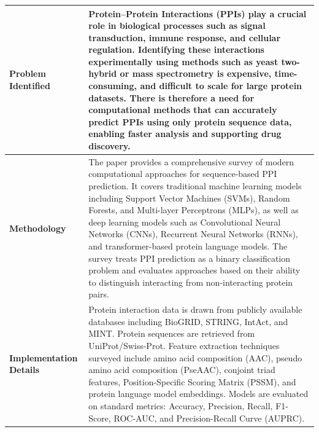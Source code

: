 \documentclass[12pt,a4paper]{report}
\begin{document}
\begin{table}[H]
\centering
\renewcommand{\arraystretch}{1.5}
\begin{tabular}{|p{}|p{}|}
\hline
\textbf{Problem Identified} & Protein–Protein Interactions (PPIs) play a crucial role in biological processes such as signal transduction, immune response, and cellular regulation. Identifying these interactions experimentally using methods such as yeast two-hybrid or mass spectrometry is expensive, time-consuming, and difficult to scale for large protein datasets. There is therefore a need for computational methods that can accurately predict PPIs using only protein sequence data, enabling faster analysis and supporting drug discovery. \\ \hline
\textbf{Methodology} & The paper provides a comprehensive survey of modern computational approaches for sequence-based PPI prediction. It covers traditional machine learning models including Support Vector Machines (SVMs), Random Forests, and Multi-layer Perceptrons (MLPs), as well as deep learning models such as Convolutional Neural Networks (CNNs), Recurrent Neural Networks (RNNs), and transformer-based protein language models. The survey treats PPI prediction as a binary classification problem and evaluates approaches based on their ability to distinguish interacting from non-interacting protein pairs. \\ \hline
\textbf{Implementation Details} & Protein interaction data is drawn from publicly available databases including BioGRID, STRING, IntAct, and MINT. Protein sequences are retrieved from UniProt/Swiss-Prot. Feature extraction techniques surveyed include amino acid composition (AAC), pseudo amino acid composition (PseAAC), conjoint triad features, Position-Specific Scoring Matrix (PSSM), and protein language model embeddings. Models are evaluated on standard metrics: Accuracy, Precision, Recall, F1-Score, ROC-AUC, and Precision-Recall Curve (AUPRC). \\ \hline
\end{tabular}
\end{table}

\newpage
\end{document}

